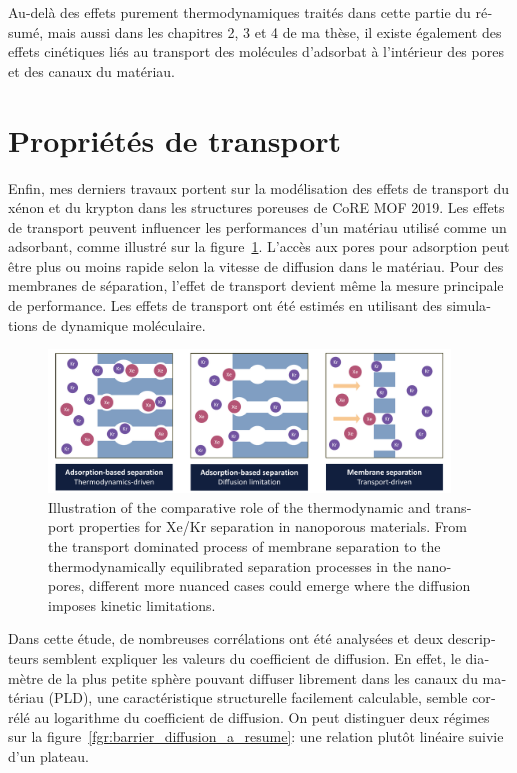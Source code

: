\documentclass[thesis]{subfiles}
\begin{document}
\begin{otherlanguage}{french}
Au-delà des effets purement thermodynamiques traités dans cette partie du résumé, mais aussi dans les chapitres 2, 3 et 4 de ma thèse, il existe également des effets cinétiques liés au transport des molécules d'adsorbat à l'intérieur des pores et des canaux du matériau.

\section*{Propriétés de transport}

Enfin, mes derniers travaux portent sur la modélisation des effets de transport du xénon et du krypton dans les structures poreuses de CoRE MOF 2019. Les effets de transport peuvent influencer les performances d'un matériau utilisé comme un adsorbant, comme illustré sur la figure~\ref{fgr:intro_diffusion_resume}. L'accès aux pores pour adsorption peut être plus ou moins rapide selon la vitesse de diffusion dans le matériau. Pour des membranes de séparation, l'effet de transport devient même la mesure principale de performance. Les effets de transport ont été estimés en utilisant des simulations de dynamique moléculaire.

\begin{figure}[ht]
    \centering
      \includegraphics[width=0.95\textwidth]{figures/5-diffusion/Diffusion.pdf}
      \caption{Illustration of the comparative role of the thermodynamic and transport properties for Xe/Kr separation in nanoporous materials. From the transport dominated process of membrane separation to the thermodynamically equilibrated separation processes in the nanopores, different more nuanced cases could emerge where the diffusion imposes kinetic limitations.}\label{fgr:intro_diffusion_resume}
  \end{figure}

Dans cette étude, de nombreuses corrélations ont été analysées et deux descripteurs semblent expliquer les valeurs du coefficient de diffusion. En effet, le diamètre de la plus petite sphère pouvant diffuser librement dans les canaux du matériau (PLD), une caractéristique structurelle facilement calculable, semble corrélé au logarithme du coefficient de diffusion. On peut distinguer deux régimes sur la figure~\ref{fgr:barrier_diffusion_a_resume}: une relation plutôt linéaire suivie d'un plateau. 


\end{otherlanguage}
\end{document}
